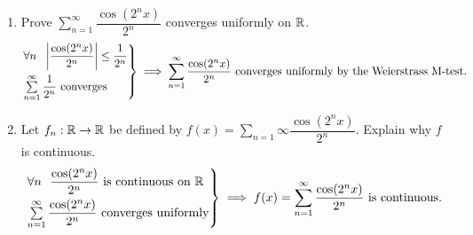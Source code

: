 \begin{example}
    \begin{enumerate}
        \item Prove $\sum \limits_{n=1}^\infty \dfrac{\cos (2^n x)}{2^n}$ converges uniformly on $\mathbb{R}$.
        \[
            \begin{rcases}
                \forall n ~~\left|\dfrac{\cos (2^nx)}{2^n}\right| \leq \dfrac{1}{2^n} \\
                \sum \limits_{n=1}^\infty \dfrac{1}{2^n} \text{ converges}
            \end{rcases} \implies \sum_{n=1}^{\infty}\dfrac{\cos (2^nx)}{2^n} \text{ converges uniformly by the Weierstrass M-test.}
        \]

        \item Let $f_n: \mathbb{R} \to \mathbb{R}$ be defined by $f(x) = \sum \limits_{n=1}\infty \dfrac{\cos (2^nx)}{2^n}.$ Explain why $f$ is continuous.
        \[
            \begin{rcases}
                \forall n ~~\dfrac{\cos (2^n x)}{2^n} \text{ is continuous on $\mathbb{R}$} \\
                \sum \limits_{n=1}^\infty \dfrac{\cos (2^nx)}{2^n} \text{ converges uniformly}
            \end{rcases} \implies f(x) = \sum_{n=1}^{\infty}\dfrac{\cos (2^nx)}{2^n} \text{ is continuous.}
        \]
    \end{enumerate}
\end{example}